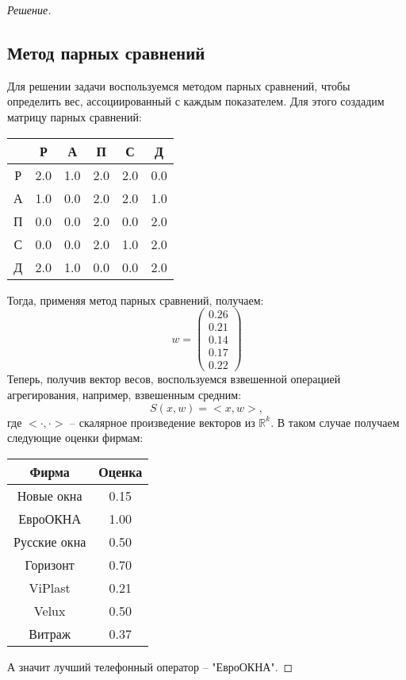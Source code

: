 \documentclass[11pt,a4paper,oneside]{article}
\newenvironment{solution}{
	\begin{proof}[Решение]
		\vspace{-8px}
		\setlength{\parskip}{4px}
		\setlength{\parindent}{0px}
	}{
	\end{proof}
}
\begin{document}
\begin{solution}
	\subsection*{Метод парных сравнений}
	Для решении задачи воспользуемся методом парных сравнений, чтобы определить вес, ассоциированный с каждым показателем. Для этого создадим матрицу парных сравнений:
	\begin{table}[!hbtp]
		\centering
		\begin{tabular}{|c|c|c|c|c|c|}
			\hline
			        & Р & А & П & С & Д  \\ \hline
			Р     & 2.0 & 1.0 & 2.0 & 2.0 & 0.0   \\ \hline
			А     &1.0 & 0.0 & 2.0 & 2.0 & 1.0 \\ \hline
			П 	  &0.0 & 0.0 & 2.0 & 0.0 & 2.0 \\ \hline
			С     & 0.0 & 0.0 & 2.0 & 1.0 & 2.0 \\ \hline
			Д     & 2.0 & 1.0 & 0.0 & 0.0 & 2.0 \\ \hline
		\end{tabular}
	\end{table}
	Тогда, применяя метод парных сравнений, получаем:
	\[
		w = 
		\begin{pmatrix} 0.26 \\ 0.21 \\ 0.14 \\ 0.17 \\ 0.22 \end{pmatrix}
	\]
	Теперь, получив вектор весов, воспользуемся взвешенной операцией агрегирования, например, взвешенным средним:
	\[
		S(x,w) = <x,w>,
	\]
	где $ <\cdot, \cdot> $ -- скалярное произведение векторов из $\mathbb{R}^k$. В таком случае получаем следующие оценки фирмам:
	\begin{table}[!hbtp]
		\centering
		\begin{tabular}{|c|c|}
			\hline
			Фирма & Оценка   \\ \hline
			Новые окна     & 0.15    \\ \hline
			ЕвроОКНА     &1.00  \\ \hline
			Русские окна 	  &0.50  \\ \hline
			Горизонт     & 0.70  \\ \hline
			ViPlast     & 0.21  \\ \hline
			Velux     & 0.50  \\ \hline
			Витраж     & 0.37  \\ \hline
		\end{tabular}
	\end{table}
	А значит лучший телефонный оператор -- "ЕвроОКНА".

\end{solution}
\end{document}
